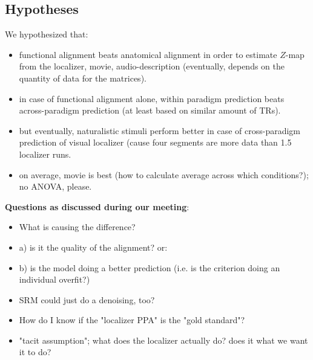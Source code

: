 \subsection{Hypotheses}


We hypothesized that:
\begin{itemize}

    \item functional alignment beats anatomical alignment in order to
        estimate $Z$-map from the localizer, movie, audio-description
        (eventually, depends on the quantity of data for the matrices).

    \item in case of functional alignment alone, within paradigm prediction
        beats across-paradigm prediction (at least based on similar amount of
        TRs).

    \item but eventually, naturalistic stimuli perform better in case of
        cross-paradigm prediction of visual localizer
        (cause four segments are more data than 1.5 localizer runs.

    \item on average, movie is best (how to calculate average across which
        conditions?); no ANOVA, please.

\end{itemize}


\textbf{Questions as discussed during our meeting}:
\begin{itemize}

    \item What is causing the difference?

    \item a) is it the quality of the alignment? or:

    \item b) is the model doing a better prediction
        (i.e. is the criterion doing an individual overfit?)

    \item SRM could just do a denoising, too?

    \item How do I know if the "localizer PPA" is the "gold standard"?

    \item "tacit assumption"; what does the localizer actually do?
        does it what we want it to do?

\end{itemize}


